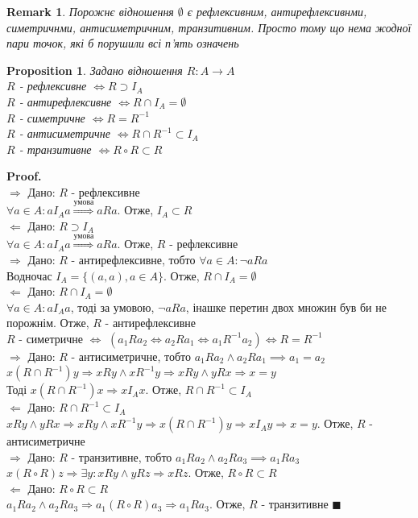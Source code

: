 \documentclass[a4paper, 14pt]{extarticle}
\def\rightproof{$\boxed{\Rightarrow}$ }
\def\leftproof{$\boxed{\Leftarrow}$ }
\theoremstyle{theoremdd}
\theoremstyle{theoremdd}
\theoremstyle{theoremdd}
\theoremstyle{theoremdd}
\theoremstyle{theoremdd}
\newtheorem{proposition}[theorem]{Proposition}
\theoremstyle{theoremdd}
\newtheorem{remark}[theorem]{Remark}
\theoremstyle{theoremdd}
\theoremstyle{theoremdd}
\newenvironment{pf}{\vspace*{-3mm} \textbf{Proof. \\}}{$\blacksquare$}
\begin{document}
\begin{remark}
Порожнє відношення $\emptyset$ є рефлексивним, антирефлексивнми, симетричнми, антисиметричним, транзитивним. Просто тому що нема жодної пари точок, які б порушили всі п'ять означень
\end{remark}

\begin{proposition}
Задано відношення $R: A \to A$\\
$R$ - рефлексивне $\iff R \supset I_A$\\
$R$ - антирефлексивне $\iff R \cap I_A = \emptyset$\\
$R$ - симетричне $\iff R = R^{-1}$\\
$R$ - антисиметричне $\iff R \cap R^{-1} \subset I_A$\\
$R$ - транзитивне $\iff R \circ R \subset R$\\
\end{proposition}

\begin{pf}
\rightproof Дано: $R$ - рефлексивне\\
$\forall a \in A: aI_Aa \overset{\text{умова}}{\Rightarrow} aRa$. Отже, $I_A \subset R$\\
\leftproof Дано: $R \supset I_A$\\
$\forall a \in A: aI_Aa \overset{\text{умова}}{\Rightarrow} aRa$. Отже, $R$ - рефлексивне
\bigskip \\
\rightproof Дано: $R$ - антирефлексивне, тобто $\forall a \in A: \neg aRa$\\
Водночас $I_A = \{(a,a), a \in A \}$.
Отже, $R \cap I_A = \emptyset$\\
\leftproof Дано: $R \cap I_A = \emptyset$\\
$\forall a \in A: aI_Aa$, тоді за умовою, $\neg aRa$, інашке перетин двох множин був би не порожнім.
Отже, $R$ - антирефлексивне
\bigskip \\
$R$ - симетричне $\iff$
$(a_1 R a_2 \iff a_2 R a_1 \iff a_1 R^{-1} a_2) \iff R = R^{-1}$
\bigskip \\
\rightproof Дано: $R$ - антисиметричне, тобто $a_1 R a_2 \wedge a_2 R a_1 \implies a_1 = a_2$\\
$x(R \cap R^{-1})y \Rightarrow xRy \wedge xR^{-1}y \Rightarrow xRy \wedge yRx \Rightarrow x=y$\\
Тоді $x(R \cap R^{-1})x \Rightarrow xI_Ax$. Отже, $R \cap R^{-1} \subset I_A$\\
\leftproof Дано: $R \cap R^{-1} \subset I_A$\\
$xRy \wedge yRx \Rightarrow xRy \wedge xR^{-1}y \Rightarrow x(R \cap R^{-1})y \Rightarrow xI_Ay \Rightarrow x = y$.
Отже, $R$ - антисиметричне
\bigskip \\
\rightproof Дано: $R$ - транзитивне, тобто $a_1 R a_2 \wedge a_2 R a_3 \implies a_1 R a_3$\\
$x(R \circ R)z \Rightarrow \exists y: xRy \wedge yRz \Rightarrow xRz$. Отже, $R \circ R \subset R$\\
\leftproof Дано: $R \circ R \subset R$\\
$a_1 R a_2 \wedge a_2 R a_3 \Rightarrow a_1 (R \circ R) a_3 \Rightarrow a_1 R a_3$. Отже, $R$ - транзитивне
\end{pf}
\end{document}
